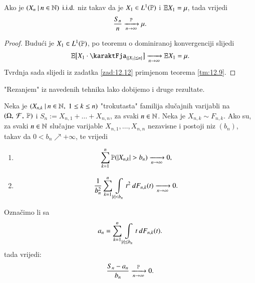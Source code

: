\begin{kor} \label{kor:12.14}
    Ako je $({X_n} \: | \: {n \in \mathbb{N}})$ $\mathrm{i.i.d.}$ niz takav da je $X_1 \in L^1(\mathbb{P})$ i $\mathbb{E} X_1 = \mu$, tada vrijedi
    \begin{equation*}
        \frac{S_n}{n} \xrightarrow[n \to \infty]{\mathbb{P}} \mu.
    \end{equation*}
\end{kor}

\begin{proof}
    Budu\' ci je $X_1 \in L^1(\mathbb{P})$, po teoremu o dominiranoj konvergenciji slijedi
    \begin{equation*}
        \masE \big[ X_1 \cdot \karaktFja_{\{ |X_1| \leq n \}} \big] \xrightarrow[n \to \infty]{} \masE X_1 = \mu.
    \end{equation*}
    Tvrdnja sada slijedi iz zadatka \ref{zad:12.12} primjenom teorema \ref{tm:12.9}.
\end{proof}

"Rezanjem" iz navedenih tehnika lako dobijemo i druge rezultate.

\begin{tm}  \label{tm:12.15}
    Neka je $({X_{n, k}} \: | \: {n \in \mathbb{N}, \; 1 \leq k \leq n})$ "trokutasta" familija slu\v cajnih varijabli na $(\Omega, \: \mathcal{F}, \: \mathbb{P})$ i $S_n := X_{n, 1} + \ldots + X_{n, n}$, za svaki $n \in \mathbb{N}$.
    Neka je $X_{n, k} \sim F_{n, k}$.
    Ako su, za svaki $n \in \mathbb{N}$ slu\v cajne varijable $X_{n, 1}, \ldots, X_{n, n}$ nezavisne i postoji niz $(b_n)$, takav da $0 < b_n \nearrow +\infty$, te vrijedi
    \begin{enumerate}[label=(\roman*)]
        \item \label{tm:12.15.1}
        \begin{equation*}
            \sum\limits_{k = 1}^{n} \mathbb{P}({|X_{n, k}| > b_n}) \xrightarrow[n \to \infty]{} 0,
        \end{equation*}
        \item \label{tm:12.15.2}
        \begin{equation*}
            \frac{1}{b_n^2} \sum\limits_{k = 1}^{n} \int\limits_{|t| < b_n} t^2 \: dF_{n, k}(t) \xrightarrow[n \to \infty]{} 0.
        \end{equation*}
    \end{enumerate}
    Ozna\v cimo li sa
    \begin{equation*}
        a_n = \sum\limits_{k = 1}^{n} \int\limits_{|t| \leq b_n} t \: dF_{n, k} (t).
    \end{equation*}
    tada vrijedi:
    \begin{equation*}
        \frac{S_n - a_n}{b_n} \xrightarrow[n \to \infty]{\mathbb{P}} 0.
    \end{equation*}    
\end{tm}

